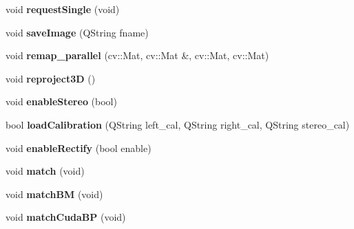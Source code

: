 \begin{DoxyCompactItemize}
\item 
\hypertarget{class_q_stereo_camera_aba9d75f6f94cc2940321db89a8965aa9}{}void {\bfseries request\+Single} (void)\label{class_q_stereo_camera_aba9d75f6f94cc2940321db89a8965aa9}

\item 
\hypertarget{class_q_stereo_camera_a09667f67f3c092c86ef57191774fc54f}{}void {\bfseries save\+Image} (Q\+String fname)\label{class_q_stereo_camera_a09667f67f3c092c86ef57191774fc54f}

\item 
\hypertarget{class_q_stereo_camera_abddae1c615d05ffe99157246dffab3bf}{}void {\bfseries remap\+\_\+parallel} (cv\+::\+Mat, cv\+::\+Mat \&, cv\+::\+Mat, cv\+::\+Mat)\label{class_q_stereo_camera_abddae1c615d05ffe99157246dffab3bf}

\item 
\hypertarget{class_q_stereo_camera_a4eacb1ad6ae4894f7c1217817ae6a5b1}{}void {\bfseries reproject3\+D} ()\label{class_q_stereo_camera_a4eacb1ad6ae4894f7c1217817ae6a5b1}

\item 
\hypertarget{class_q_stereo_camera_ac8b2af9c26a781d590b6e2fcef243dd5}{}void {\bfseries enable\+Stereo} (bool)\label{class_q_stereo_camera_ac8b2af9c26a781d590b6e2fcef243dd5}

\item 
\hypertarget{class_q_stereo_camera_ac1fb3bbffb92e25ada482507933559f3}{}bool {\bfseries load\+Calibration} (Q\+String left\+\_\+cal, Q\+String right\+\_\+cal, Q\+String stereo\+\_\+cal)\label{class_q_stereo_camera_ac1fb3bbffb92e25ada482507933559f3}

\item 
\hypertarget{class_q_stereo_camera_abe84b80ad1aa56490f266568e57b7758}{}void {\bfseries enable\+Rectify} (bool enable)\label{class_q_stereo_camera_abe84b80ad1aa56490f266568e57b7758}

\item 
\hypertarget{class_q_stereo_camera_a9527e512bd5667a9702a65bb4255319d}{}void {\bfseries match} (void)\label{class_q_stereo_camera_a9527e512bd5667a9702a65bb4255319d}

\item 
\hypertarget{class_q_stereo_camera_ae9da43ba9c4b87cc206932fb011499f8}{}void {\bfseries match\+B\+M} (void)\label{class_q_stereo_camera_ae9da43ba9c4b87cc206932fb011499f8}

\item 
\hypertarget{class_q_stereo_camera_aa4ffccf0f4c98a1a37f8664e9207a4bf}{}void {\bfseries match\+Cuda\+B\+P} (void)\label{class_q_stereo_camera_aa4ffccf0f4c98a1a37f8664e9207a4bf}


\end{DoxyCompactItemize}
